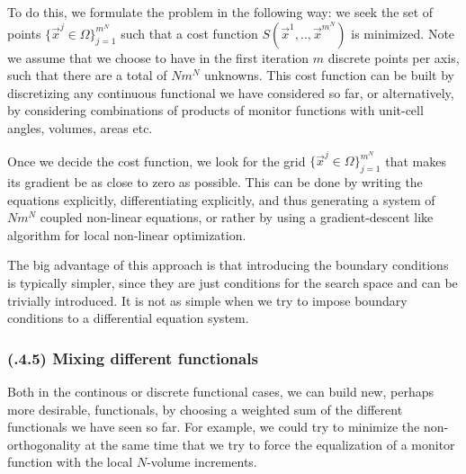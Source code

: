 \documentclass[11pt, a4paper]{article} %
\begin{document}
To do this, we formulate the problem in the following way: we seek the set of points $\{\vec{x}^j\in \Omega\}_{j=1}^{m^N}$ such that a cost function $S(\vec{x}^1,..,\vec{x}^{m^N})$ is minimized. Note we assume that we choose to have in the first iteration $m$ discrete points per axis, such that there are a total of $Nm^N$ unknowns. This cost function can be built by discretizing any continuous functional we have considered so far, or alternatively, by considering combinations of products of monitor functions with unit-cell angles, volumes, areas etc. 

Once we decide the cost function, we look for the grid $\{\vec{x}^j\in \Omega\}_{j=1}^{m^N}$ that makes its gradient be as close to zero as possible. This can be done by writing the equations explicitly, differentiating explicitly, and thus generating a system of $Nm^N$ coupled non-linear equations, or rather by using a gradient-descent like algorithm for local non-linear optimization.

The big advantage of this approach is that introducing the boundary conditions is typically simpler, since they are just conditions for the search space and can be trivially introduced. It is not as simple when we try to impose boundary conditions to a differential equation system.

\subsubsection*{\bf (\textgamma.4.5) Mixing different functionals}
Both in the continous or discrete functional cases, we can build new, perhaps more desirable, functionals, by choosing a weighted sum of the different functionals we have seen so far. For example, we could try to minimize the non-orthogonality at the same time that we try to force the equalization of a monitor function with the local $N$-volume increments.








\newpage

\end{document}
